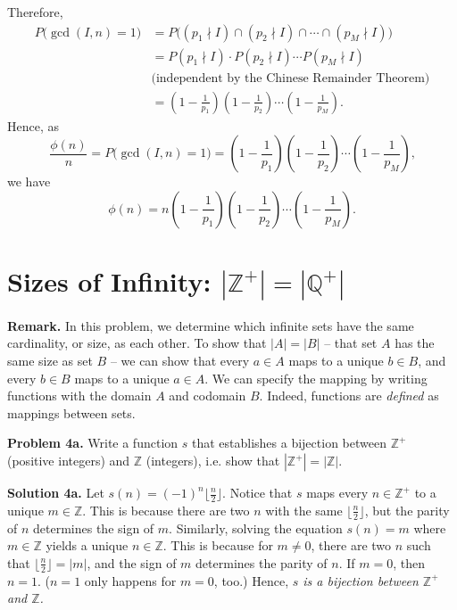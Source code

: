 \documentclass{article}
\begin{document}
\bigskip

Therefore,
\begin{equation*}
    \begin{split}
       P \Big( \gcd(I,n) = 1 \Big) &= P \Big( (p_1 \nmid I) \cap (p_2 \nmid I) \cap \cdots \cap (p_M \nmid I) \Big) \\
        &= P(p_1 \nmid I) \cdot P(p_2 \nmid I) \cdots P(p_M \nmid I) \\
        &\text{(independent by the Chinese Remainder Theorem)} \\
        &= \left( 1 - \frac{1}{p_1} \right) \left( 1 - \frac{1}{p_2} \right) \cdots \left( 1 - \frac{1}{p_M} \right) \text{.}
    \end{split}
\end{equation*}
Hence, as
\[
    \frac{\phi(n)}{n} = P \Big( \gcd(I,n) = 1 \Big) = \left( 1 - \frac{1}{p_1} \right) \left( 1 - \frac{1}{p_2} \right) \cdots \left( 1 - \frac{1}{p_M} \right) \text{,}
\]
we have
\[
    \phi(n) = n \left( 1 - \frac{1}{p_1} \right) \left( 1 - \frac{1}{p_2} \right) \cdots \left( 1 - \frac{1}{p_M} \right) \text{.}
\]

\section{Sizes of Infinity: $|\mathbb{Z^+}| = |\mathbb{Q^+}|$}

\noindent\textbf{Remark.} In this problem, we determine which infinite sets have the same cardinality, or size, as each other. To show that $|A| = |B|$ -- that set $A$ has the same size as set $B$ -- we can show that every $a \in A$ maps to a unique $b \in B$, and every $b \in B$ maps to a unique $a \in A$. We can specify the mapping by writing functions with the domain $A$ and codomain $B$. Indeed, functions are \textit{defined} as mappings between sets.

\bigskip

\noindent\textbf{Problem 4a.} Write a function $s$ that establishes a bijection between $\mathbb{Z^+}$ (positive integers) and $\mathbb{Z}$ (integers), i.e. show that $|\mathbb{Z}^+| = |\mathbb{Z}|$.

\bigskip

\noindent\textbf{Solution 4a.} Let $s(n) = (-1)^n \lfloor \frac{n}{2} \rfloor$. Notice that $s$ maps every $n \in \mathbb{Z^+}$ to a unique $m \in \mathbb{Z}$. This is because there are two $n$ with the same $\lfloor \frac{n}{2} \rfloor$, but the parity of $n$ determines the sign of $m$. Similarly, solving the equation $s(n) = m$ where $m \in \mathbb{Z}$ yields a unique $n \in \mathbb{Z}$. This is because for $m \neq 0$, there are two $n$ such that $\lfloor \frac{n}{2} \rfloor = |m|$, and the sign of $m$ determines the parity of $n$. If $m = 0$, then $n = 1$. ($n = 1$ only happens for $m = 0$, too.) Hence, \textit{$s$ is a bijection between $\mathbb{Z^+}$ and $\mathbb{Z}$.}
\end{document}
